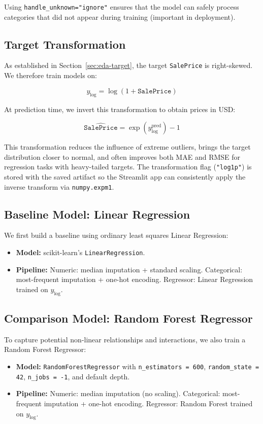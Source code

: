 \documentclass[11pt,a4paper]{article}
\begin{document}
Using \texttt{handle\_unknown="ignore"} ensures that the model can safely process categories that did not appear during training (important in deployment).

\subsection{Target Transformation}

As established in Section~\ref{sec:eda-target}, the target \texttt{SalePrice} is right-skewed.
We therefore train models on:

\[
y_{\log} = \log(1 + \texttt{SalePrice})
\]

At prediction time, we invert this transformation to obtain prices in USD:

\[
\widehat{\texttt{SalePrice}} = \exp(y_{\log}^{\text{pred}}) - 1
\]

This transformation reduces the influence of extreme outliers, brings the target distribution closer to normal, and often improves both MAE and RMSE for regression tasks with heavy-tailed targets.
The transformation flag (\texttt{"log1p"}) is stored with the saved artifact so the Streamlit app can consistently apply the inverse transform via \texttt{numpy.expm1}.

\subsection{Baseline Model: Linear Regression}

We first build a baseline using ordinary least squares Linear Regression:

\begin{itemize}[leftmargin=*]
    \item \textbf{Model:} scikit-learn's \texttt{LinearRegression}.
    \item \textbf{Pipeline:} Numeric: median imputation + standard scaling. Categorical: most-frequent imputation + one-hot encoding. Regressor: Linear Regression trained on \(y_{\log}\).
\end{itemize}

\subsection{Comparison Model: Random Forest Regressor}

To capture potential non-linear relationships and interactions, we also train a Random Forest Regressor:

\begin{itemize}[leftmargin=*]
    \item \textbf{Model:} \texttt{RandomForestRegressor} with \texttt{n\_estimators = 600}, \texttt{random\_state = 42}, \texttt{n\_jobs = -1}, and default depth.
    \item \textbf{Pipeline:} Numeric: median imputation (no scaling). Categorical: most-frequent imputation + one-hot encoding. Regressor: Random Forest trained on \(y_{\log}\).
\end{itemize}
\end{document}
